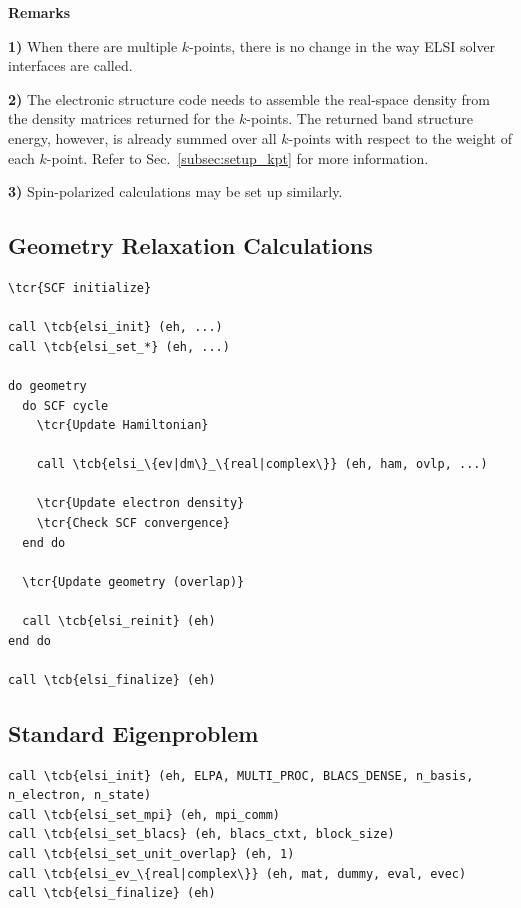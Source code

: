 \documentclass{report}
\newcommand{\tcb}[1]{\textcolor{blue}{#1}}
\newcommand{\tcr}[1]{\textcolor{red}{#1}}
\begin{document}
\textbf{Remarks}

\textbf{1)} When there are multiple $k$-points, there is no change in the way ELSI solver interfaces are called.

\textbf{2)} The electronic structure code needs to assemble the real-space density from the density matrices returned for the $k$-points. The returned band structure energy, however, is already summed over all $k$-points with respect to the weight of each $k$-point. Refer to Sec.~\ref{subsec:setup_kpt} for more information.

\textbf{3)} Spin-polarized calculations may be set up similarly.

\subsection*{Geometry Relaxation Calculations}
\begin{tcolorbox}
\begin{Verbatim}[commandchars=\\\{\}]
\tcr{SCF initialize}

call \tcb{elsi_init} (eh, ...)
call \tcb{elsi_set_*} (eh, ...)

do geometry
  do SCF cycle
    \tcr{Update Hamiltonian}

    call \tcb{elsi_\{ev|dm\}_\{real|complex\}} (eh, ham, ovlp, ...)

    \tcr{Update electron density}
    \tcr{Check SCF convergence}
  end do

  \tcr{Update geometry (overlap)}

  call \tcb{elsi_reinit} (eh)
end do

call \tcb{elsi_finalize} (eh)
\end{Verbatim}
\end{tcolorbox}

\subsection*{Standard Eigenproblem}
\begin{tcolorbox}
\begin{Verbatim}[commandchars=\\\{\}]
call \tcb{elsi_init} (eh, ELPA, MULTI_PROC, BLACS_DENSE, n_basis, n_electron, n_state)
call \tcb{elsi_set_mpi} (eh, mpi_comm)
call \tcb{elsi_set_blacs} (eh, blacs_ctxt, block_size)
call \tcb{elsi_set_unit_overlap} (eh, 1)
call \tcb{elsi_ev_\{real|complex\}} (eh, mat, dummy, eval, evec)
call \tcb{elsi_finalize} (eh)
\end{Verbatim}
\end{tcolorbox}
\end{document}
